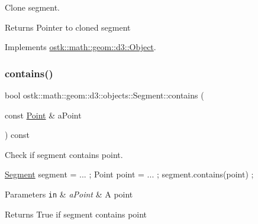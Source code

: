 Clone segment. 

\begin{DoxyReturn}{Returns}
Pointer to cloned segment 
\end{DoxyReturn}


Implements \hyperlink{classostk_1_1math_1_1geom_1_1d3_1_1_object_a676013f9555f6492687f9809b2db887b}{ostk\+::math\+::geom\+::d3\+::\+Object}.

\mbox{\label{classostk_1_1math_1_1geom_1_1d3_1_1objects_1_1_segment_a07d2c8bc8f734b3a99fb4f11610f9fab}} 
\subsubsection{\texorpdfstring{contains()}{contains()}}
{\footnotesize\ttfamily bool ostk\+::math\+::geom\+::d3\+::objects\+::\+Segment\+::contains (\begin{DoxyParamCaption}\item[{const \hyperlink{classostk_1_1math_1_1geom_1_1d3_1_1objects_1_1_point}{Point} \&}]{a\+Point }\end{DoxyParamCaption}) const}



Check if segment contains point. 


\begin{DoxyCode}
\hyperlink{classostk_1_1math_1_1geom_1_1d3_1_1objects_1_1_segment_aa2cb60ce06335a5f76120c658219494c}{Segment} segment = ... ;
Point point = ... ;
segment.contains(point) ;
\end{DoxyCode}



\begin{DoxyParams}[1]{Parameters}
\mbox{\tt in}  & {\em a\+Point} & A point \\
\hline
\end{DoxyParams}
\begin{DoxyReturn}{Returns}
True if segment contains point 
\end{DoxyReturn}
\mbox{\label{classostk_1_1math_1_1geom_1_1d3_1_1objects_1_1_segment_a403915ebd6906ff29c93728b5bb8bbba}} 
